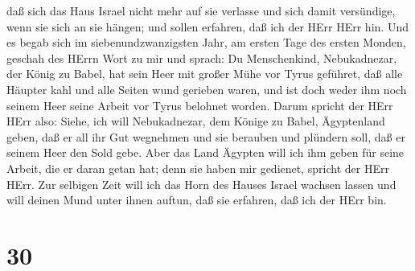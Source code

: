  daß sich das Haus Israel nicht mehr auf sie verlasse und
sich damit versündige, wenn sie sich an sie hängen; und sollen erfahren,
daß ich der HErr HErr hin.  Und es begab sich im
siebenundzwanzigsten Jahr, am ersten Tage des ersten Monden, geschah des
HErrn Wort zu mir und sprach:  Du Menschenkind,
Nebukadnezar, der König zu Babel, hat sein Heer mit großer Mühe vor
Tyrus geführet, daß alle Häupter kahl und alle Seiten wund gerieben
waren, und ist doch weder ihm noch seinem Heer seine Arbeit vor Tyrus
belohnet worden.  Darum spricht der HErr HErr also: Siehe,
ich will Nebukadnezar, dem Könige zu Babel, Ägyptenland geben, daß er
all ihr Gut wegnehmen und sie berauben und plündern soll, daß er seinem
Heer den Sold gebe.  Aber das Land Ägypten will ich ihm
geben für seine Arbeit, die er daran getan hat; denn sie haben mir
gedienet, spricht der HErr HErr.  Zur selbigen Zeit will
ich das Horn des Hauses Israel wachsen lassen und will deinen Mund unter
ihnen auftun, daß sie erfahren, daß ich der HErr bin.

\hypertarget{section-29}{%
\section{30}\label{section-29}}

